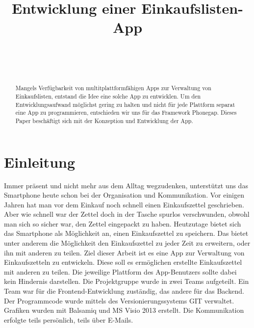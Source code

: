 \documentclass[10pt, conference, compsocconf]{IEEEtran}
\begin{document}
\title{Entwicklung einer Einkaufslisten-App}


\author{
\\
\and
{}
\\
}

\maketitle


\begin{abstract}
Mangels Verf\"ugbarkeit von multitplattformf\"ahigen Apps zur Verwaltung von Einkaufslisten, entstand die Idee eine solche App zu entwicklen. Um den Entwicklungsaufwand m\"oglichst gering zu halten und nicht f\"ur jede Plattform separat eine App zu programmieren, entschieden wir uns f\"ur das Framework Phonegap. Dieses Paper besch\"aftigt sich mit der Konzeption und Entwicklung der App.   
\end{abstract}

\IEEEpeerreviewmaketitle

\section{Einleitung}
Immer pr\"asent und nicht mehr aus dem Alltag wegzudenken, unterst\"utzt  uns das Smartphone heute schon bei der Organisation und Kommunikation. Vor einigen Jahren hat man vor dem Einkauf noch schnell einen Einkaufszettel geschrieben. Aber wie schnell war der Zettel doch in der Tasche spurlos verschwunden, obwohl man sich so sicher war, den Zettel eingepackt zu haben. Heutzutage bietet sich das Smartphone als M\"oglichkeit an, einen Einkaufszettel zu speichern. Das bietet unter anderem die M\"oglichkeit den Einkaufszettel zu jeder Zeit zu erweitern, oder ihn mit anderen zu teilen. 
Ziel dieser Arbeit ist es eine App zur Verwaltung von Einkaufszetteln zu entwickeln.
Diese soll es erm\"oglichen erstellte Einkaufszettel mit anderen zu teilen.
Die jeweilige Plattform des App-Benutzers sollte dabei kein Hindernis darstellen.
Die Projektgruppe wurde in zwei Teams aufgeteilt. 
Ein Team war f\"ur die Frontend-Entwicklung zust\"andig, das andere f\"ur das Backend. 
Der Programmcode wurde mittels des Versionierungssystems GIT verwaltet. 
Grafiken wurden mit Balsamiq und MS Visio 2013 erstellt. 
Die Kommunikation erfolgte teils pers\"onlich, teils \"uber E-Mails.
\end{document}
